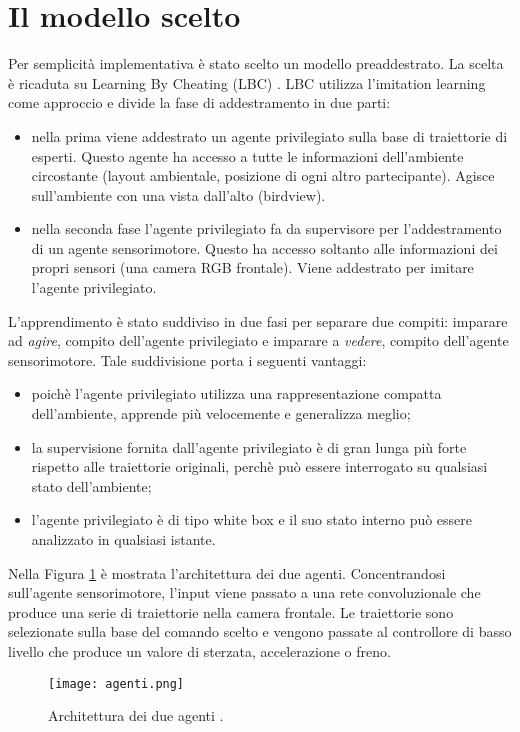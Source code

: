 \section{Il modello scelto}
Per semplicità implementativa è stato scelto un modello preaddestrato. La scelta è ricaduta su Learning By Cheating (LBC) \cite{lbc}. LBC utilizza l'imitation learning come
approccio e divide la fase di addestramento in due parti: \begin{itemize}
    \item nella prima viene addestrato un agente privilegiato sulla base di traiettorie di esperti. Questo agente ha accesso a tutte le informazioni 
    dell'ambiente circostante (layout ambientale, posizione di ogni altro partecipante). Agisce sull'ambiente con una vista dall'alto (birdview).
    \item nella seconda fase l'agente privilegiato fa da supervisore per l'addestramento di un agente sensorimotore. Questo ha accesso soltanto alle informazioni dei
    propri sensori (una camera RGB frontale). Viene addestrato per imitare l'agente privilegiato.
\end{itemize}
L'apprendimento è stato suddiviso in due fasi per separare due compiti: imparare ad \emph{agire}, compito dell'agente privilegiato e imparare a \emph{vedere}, compito dell'agente sensorimotore.
Tale suddivisione porta i seguenti vantaggi:\begin{itemize}
    \item poichè l'agente privilegiato utilizza una rappresentazione compatta dell'ambiente, apprende più velocemente e generalizza meglio;
    \item la supervisione fornita dall'agente privilegiato è di gran lunga più forte rispetto alle traiettorie originali, perchè può essere interrogato 
    su qualsiasi stato dell'ambiente;
    \item l'agente privilegiato è di tipo white box e il suo stato interno può essere analizzato in qualsiasi istante.
\end{itemize}
Nella Figura \ref{fig:arch} è mostrata l'architettura dei due agenti. Concentrandosi sull'agente sensorimotore, l'input viene passato a una rete convoluzionale che produce una serie di 
traiettorie nella camera frontale. Le traiettorie  sono selezionate sulla base del comando scelto e vengono passate al controllore di basso livello che produce un valore di sterzata, accelerazione o freno.
\begin{figure}[h!]
    \texttt{[image: agenti.png]}
    \caption{Architettura dei due agenti \cite{lbc}.}
    \label{fig:arch}
\end{figure}
